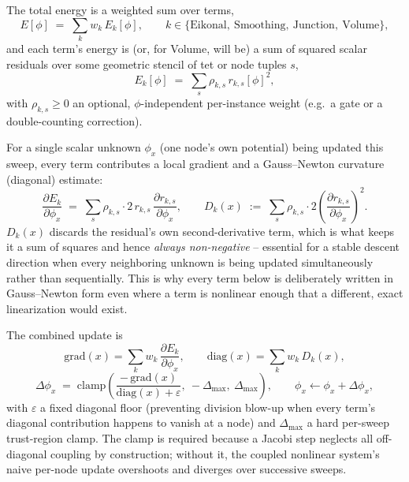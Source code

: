 \documentclass[11pt]{article}
\begin{document}
The total energy is a weighted sum over terms,
\begin{equation}
  E[\phi] \;=\; \sum_{k} w_k\, E_k[\phi],
  \qquad k \in \{\text{Eikonal},\ \text{Smoothing},\ \text{Junction},\
  \text{Volume}\},
\end{equation}
and each term's energy is (or, for Volume, will be) a sum of squared scalar
residuals over some geometric stencil of tet or node tuples $s$,
\begin{equation}
  E_k[\phi] \;=\; \sum_{s} \rho_{k,s}\, r_{k,s}[\phi]^2,
\end{equation}
with $\rho_{k,s} \ge 0$ an optional, $\phi$-independent per-instance weight
(e.g.\ a gate or a double-counting correction).

For a single scalar unknown $\phi_x$ (one node's own potential) being
updated this sweep, every term contributes a local gradient and a
Gauss--Newton curvature (diagonal) estimate:
\begin{equation}
  \frac{\partial E_k}{\partial \phi_x} \;=\; \sum_s \rho_{k,s}\cdot 2\,
  r_{k,s}\,\frac{\partial r_{k,s}}{\partial \phi_x},
  \qquad
  D_k(x) \;:=\; \sum_s \rho_{k,s}\cdot 2\left(\frac{\partial
  r_{k,s}}{\partial \phi_x}\right)^{\!2}.
  \label{eq:gaussnewton}
\end{equation}
$D_k(x)$ discards the residual's own second-derivative term, which is what
keeps it a sum of squares and hence \emph{always non-negative} -- essential
for a stable descent direction when every neighboring unknown is being
updated simultaneously rather than sequentially. This is why every term
below is deliberately written in Gauss--Newton form even where a term is
nonlinear enough that a different, exact linearization would exist.

The combined update is
\begin{equation}
  \text{grad}(x) = \sum_k w_k\,\frac{\partial E_k}{\partial\phi_x}, \qquad
  \text{diag}(x) = \sum_k w_k\, D_k(x),
\end{equation}
\begin{equation}
  \Delta\phi_x \;=\; \mathrm{clamp}\!\left(
    \frac{-\,\text{grad}(x)}{\text{diag}(x) + \varepsilon},\
    -\Delta_{\max},\ \Delta_{\max}
  \right), \qquad \phi_x \leftarrow \phi_x + \Delta\phi_x,
  \label{eq:update}
\end{equation}
with $\varepsilon$ a fixed diagonal floor (preventing division blow-up when
every term's diagonal contribution happens to vanish at a node) and
$\Delta_{\max}$ a hard per-sweep trust-region clamp. The clamp is required
because a Jacobi step neglects all off-diagonal coupling by construction;
without it, the coupled nonlinear system's naive per-node update
overshoots and diverges over successive sweeps.
\end{document}
